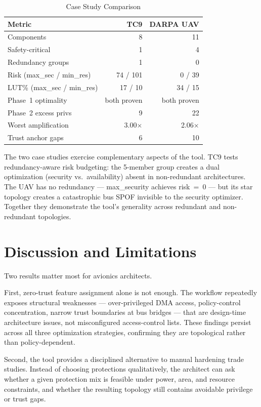 \documentclass[conference]{IEEEtran}
\begin{document}
\begin{table}[t]
\caption{Case Study Comparison}
\label{tab:casestudy}
\centering
\scriptsize
\begin{tabular}{lrr}
\toprule
Metric & TC9 & DARPA UAV \\
\midrule
Components          &  8 & 11 \\
Safety-critical     &  1 &  4 \\
Redundancy groups   &  1 &  0 \\
Risk (max\_sec / min\_res) & 74 / 101 & 0 / 39 \\
LUT\% (max\_sec / min\_res) & 17 / 10 & 34 / 15 \\
Phase~1 optimality & both proven & both proven \\
Phase~2 excess privs&  9 & 22 \\
Worst amplification & 3.00$\times$ & 2.06$\times$ \\
Trust anchor gaps   &  6 & 10 \\
\bottomrule
\end{tabular}
\end{table}

The two case studies exercise complementary aspects of the tool. TC9 tests
redundancy-aware risk budgeting: the 5-member group creates a dual
optimization (security vs.\ availability) absent in non-redundant
architectures. The UAV has no redundancy --- max\_security achieves
risk~=~0 --- but its star topology creates a catastrophic bus SPOF
invisible to the security optimizer. Together they demonstrate the tool's
generality across redundant and non-redundant topologies.

\section{Discussion and Limitations}

Two results matter most for avionics architects.

First, zero-trust feature assignment alone is not enough. The workflow
repeatedly exposes structural weaknesses --- over-privileged DMA access,
policy-control concentration, narrow trust boundaries at bus bridges ---
that are design-time architecture issues, not misconfigured access-control
lists. These findings persist across all three optimization strategies,
confirming they are topological rather than policy-dependent.

Second, the tool provides a disciplined alternative to manual hardening
trade studies. Instead of choosing protections qualitatively, the architect
can ask whether a given protection mix is feasible under power, area, and
resource constraints, and whether the resulting topology still contains
avoidable privilege or trust gaps.
\end{document}
